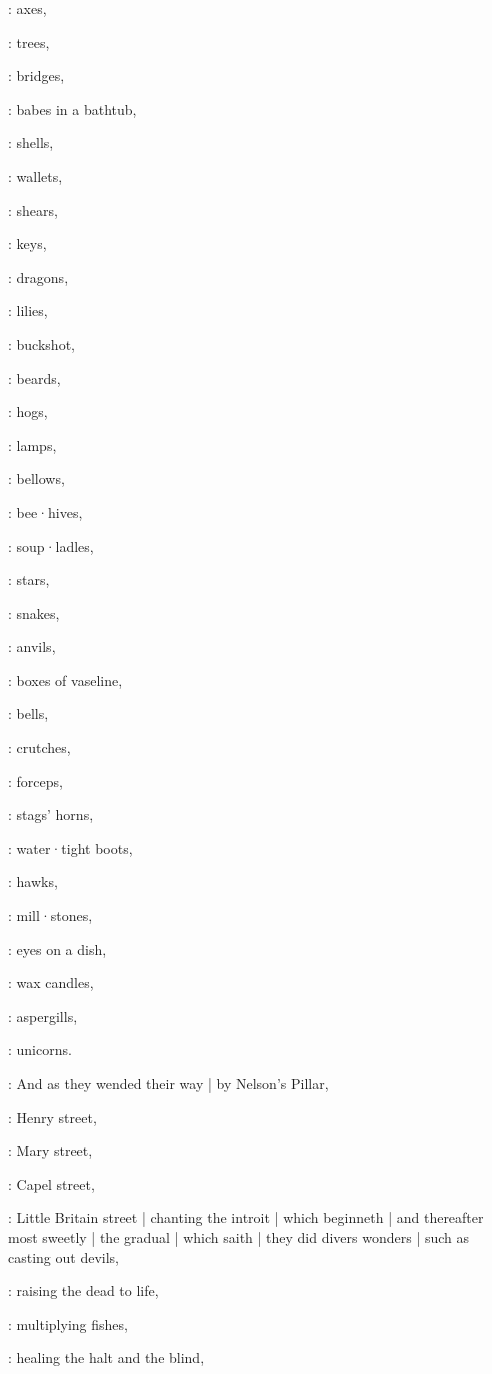 :
axes,

:
trees,

:
bridges,

:
babes in a bathtub,

:
shells,

:
wallets,

:
shears,

:
keys,

:
dragons,

:
lilies,

:
buckshot,

:
beards,

:
hogs,

:
lamps,

:
bellows,

:
bee·hives,

:
soup·ladles,

:
stars,

:
snakes,

:
anvils,

:
boxes of vaseline,

:
bells,

:
crutches,

:
forceps,

:
stags' horns,

:
water·tight boots,

:
hawks,

:
mill·stones,

:
eyes on a dish,

:
wax candles,

:
aspergills,

:
unicorns.

:
And as they wended their way |
by Nelson's Pillar,

:
Henry street,

:
Mary street,

:
Capel street,

:
Little Britain street |
chanting the introit  |
which beginneth
 |
and thereafter most sweetly |
the gradual  |
which saith  |
they did divers wonders |
such as casting out devils,

:
raising the dead to life,

:
multiplying fishes,

:
healing the halt and the blind,


